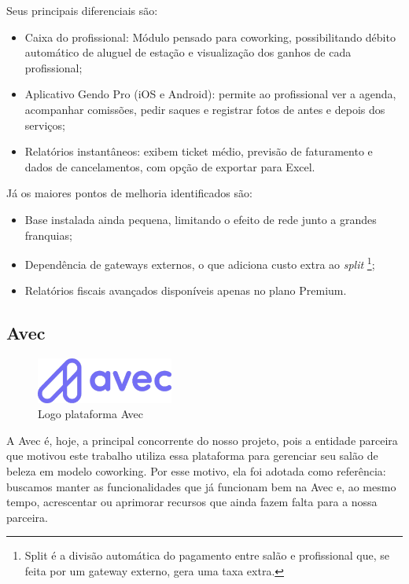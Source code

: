Seus principais diferenciais são:
\begin{itemize}
	\item Caixa do profissional: Módulo pensado para coworking, possibilitando débito automático de aluguel de estação e visualização dos ganhos de cada profissional;
	\item Aplicativo Gendo Pro (iOS e Android): permite ao profissional ver a agenda, acompanhar comissões, pedir saques e registrar fotos de antes e depois dos serviços;
	\item Relatórios instantâneos: exibem ticket médio, previsão de faturamento e dados de cancelamentos, com opção de exportar para Excel.
\end{itemize}


Já os maiores pontos de melhoria identificados são:
\begin{itemize}
	\item Base instalada ainda pequena, limitando o efeito de rede junto a grandes franquias;
	\item Dependência de gateways externos, o que adiciona custo extra ao \emph{split} \footnote{Split é a divisão automática do pagamento entre salão e profissional que, se feita por um gateway externo, gera uma taxa extra.};
	\item Relatórios fiscais avançados disponíveis apenas no plano Premium.
\end{itemize}

\subsection{Avec}

\begin{figure}[htb]
	\centering
	\includegraphics[width=0.4\textwidth]{cap01-Introducao/Images/1.4.3_Avec}
	\caption{Logo plataforma Avec}
	\label{fig:Avec}
\end{figure}

A Avec é, hoje, a principal concorrente do nosso projeto, pois a entidade parceira que motivou este trabalho utiliza essa plataforma para gerenciar seu salão de beleza em modelo coworking. Por esse motivo, ela foi adotada como referência: buscamos manter as funcionalidades que já funcionam bem na Avec e, ao mesmo tempo, acrescentar ou aprimorar recursos que ainda fazem falta para a nossa parceira.

